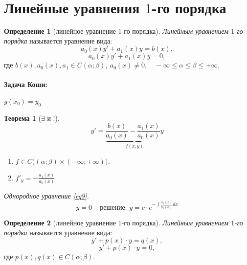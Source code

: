 \documentclass[11pt,a4paper,oneside]{report}
\theoremstyle{definition}
\newtheorem{definition}{Определение}[section]
\theoremstyle{plain}
\newtheorem{theorem}{Теорема}[section]
\theoremstyle{remark}
\begin{document}
\section{Линейные уравнения $1$-го порядка}

\begin{definition}[линейное уравнение $1$-го порядка]
    \emph{Линейным уравнением $1$-го порядка} называется уравнение вида:
    \begin{equation}\label{eq8}
        a_0(x)y' + a_1(x)y = b(x),
    \end{equation}
    \begin{equation}\label{eq9}
        a_0(x)y' + a_1(x)y = 0,
    \end{equation}
    где $b(x), a_0(x),a_1 \in C(\alpha;\beta), \ a_0(x) \ne 0, \quad -\infty \leqslant \alpha \leqslant\beta\leqslant+\infty$.
\end{definition}

\paragraph*{Задача Коши:} $y(x_0) = y_0$

\begin{theorem}[$\exists$ и $!$]
    \begin{equation*}
        y' = \underbrace{\frac{b(x)}{a_0(x)} - \frac{a_1(x)}{a_0(x)}y}_{f(x,y)}
    \end{equation*}
    \begin{enumerate}
        \item $f\in C\big((\alpha;\beta) \times (-\infty;+\infty)\big)$.
        \item $f'_y = -\frac{a_1(x)}{a_0(x)}$
    \end{enumerate}

    Однородное уравнение \ref{eq9}.
    \begin{equation*}
        y = 0\text{ -- решение: }y = c\cdot e^{-\int \frac{a_1(x)}{a_0(x)}dx}
    \end{equation*}
\end{theorem}

\begin{definition}[линейное уравнение $1$-го порядка]
    \emph{Линейным уравнением $1$-го порядка} называется уравнение вида:
    \begin{equation}\label{eq10}
        y'+p(x)\cdot y = q(x),
    \end{equation}
    \begin{equation}\label{eq11}
        y' + p(x)\cdot y = 0,
    \end{equation}
    где $p(x),q(x) \in C(\alpha;\beta)$.
\end{definition}
\end{document}
